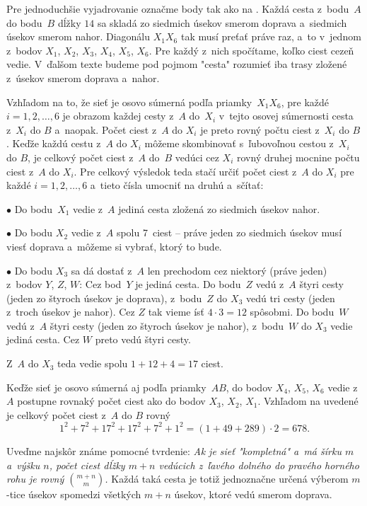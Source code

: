 {%
Pre jednoduchšie vyjadrovanie označme body tak ako na \obr. Každá cesta z~bodu~$A$ do bodu~$B$ dĺžky $14$ sa skladá zo siedmich úsekov smerom doprava a~siedmich úsekov smerom nahor. Diagonálu $X_1X_6$ tak musí preťať práve raz, a~to v~jednom z~bodov $X_1$, $X_2$, $X_3$, $X_4$, $X_5$, $X_6$.
Pre každý z~nich spočítame, koľko ciest cezeň vedie. V~ďalšom texte budeme pod pojmom "cesta" rozumieť iba trasy zložené z~úsekov smerom doprava a~nahor.
%

Vzhľadom na to, že sieť je osovo súmerná podľa priamky~$X_1X_6$, pre každé $i=1,2,\dots,6$ je obrazom každej cesty z~$A$ do~$X_i$ v~tejto osovej súmernosti cesta z~$X_i$ do $B$ a~naopak. Počet ciest z~$A$ do $X_i$ je preto rovný počtu ciest z~$X_i$ do $B$. Keďže každú cestu z~$A$ do $X_i$ môžeme skombinovať s~ľubovoľnou cestou z~$X_i$ do $B$, je celkový počet ciest z~$A$ do~$B$ vedúci cez $X_i$ rovný druhej mocnine počtu ciest z~$A$ do $X_i$. Pre celkový výsledok teda stačí určiť počet ciest z~$A$ do $X_i$ pre každé $i=1,2,\dots,6$ a~tieto čísla umocniť na druhú a~sčítať:\smallskip
\item{$\bullet$} Do bodu~$X_1$ vedie z~$A$ jediná cesta zložená zo siedmich úsekov nahor.
\item{$\bullet$} Do bodu $X_2$ vedie z~$A$ spolu 7~ciest -- práve jeden zo siedmich úsekov musí viesť doprava a~môžeme si vybrať, ktorý to bude.
\item{$\bullet$} Do bodu $X_3$ sa dá dostať z~$A$ len prechodom cez niektorý (práve jeden) z~bodov $Y$, $Z$, $W$:
\itemitem{$\triangleright$} Cez bod~$Y$ je jediná cesta.
\itemitem{$\triangleright$} Do bodu~$Z$ vedú z~$A$ štyri cesty (jeden zo štyroch úsekov je doprava), z~bodu~$Z$ do $X_3$ vedú tri cesty (jeden z~troch úsekov je nahor). Cez $Z$ tak vieme ísť ${4\cdot3}=12$ spôsobmi.
\itemitem{$\triangleright$} Do bodu~$W$ vedú z~$A$ štyri cesty (jeden zo štyroch úsekov je nahor), z~bodu~$W$ do $X_3$ vedie jediná cesta. Cez $W$ preto vedú štyri cesty.\endgraf
\item{}Z~$A$ do $X_3$ teda vedie spolu $1+12+4=17$ ciest.

\smallskip\noindent
Keďže sieť je osovo súmerná aj podľa priamky~$AB$, do bodov $X_4$, $X_5$, $X_6$ vedie z~$A$ postupne rovnaký počet ciest ako do bodov $X_3$, $X_2$, $X_1$. Vzhľadom na uvedené je celkový počet ciest z~$A$ do $B$ rovný
$$
1^2+7^2+17^2+17^2+7^2+1^2=(1+49+289)\cdot2=678.
$$

\ineriesenie
Uveďme najskôr známe pomocné tvrdenie: {\sl Ak je sieť "kompletná" a~má šírku $m$ a~výšku $n$, počet ciest dĺžky $m+n$ vedúcich z~ľavého dolného do pravého horného rohu je rovný $m+n\choose m$.} Každá taká cesta je totiž jednoznačne určená výberom $m$-tice úsekov spomedzi všetkých $m+n$ úsekov, ktoré vedú smerom doprava.

}
